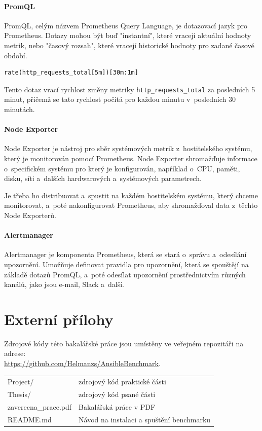 \subsubsection{PromQL}
PromQL, celým názvem Prometheus Query Language, je dotazovací jazyk pro Prometheus.
Dotazy mohou být buď "instantní", které vracejí aktuální hodnoty metrik, nebo "časový rozsah", které vracejí historické hodnoty pro zadané časové období. \cite{prometheusdocs}
\begin{lstlisting}[language=promql, caption={PromQL - ukázka dotazů}, label={lst:promql}, captionpos=b]
    rate(http_requests_total[5m])[30m:1m]
\end{lstlisting}
Tento dotaz vrací rychlost změny metriky \texttt{http\_requests\_total} za posledních 5 minut, přičemž se tato rychlost počítá pro každou minutu v~posledních 30 minutách.
\clearpage
\subsubsection{Node Exporter}
Node Exporter je nástroj pro sběr systémových metrik z~hostitelského systému, který je monitorován pomocí Prometheus.
Node Exporter shromažďuje informace o~specifickém systému pro který je konfigurován, například o~CPU, paměti, disku, síti a~dalších hardwarových a~systémových parametrech. \cite{prometheusdocs}

Je třeba ho distribuovat a~spustit na každém hostitelském systému, který chceme monitorovat, a~poté nakonfigurovat Prometheus, aby shromažďoval data z~těchto Node Exporterů. \cite{prometheusdocs}
\subsubsection{Alertmanager}
Alertmanager je komponenta Prometheus, která se stará o~správu a~odesílání upozornění.
Umožňuje definovat pravidla pro upozornění, která se spouštějí na základě dotazů PromQL, a~poté odesílat upozornění prostřednictvím různých kanálů, jako jsou e-mail, Slack a~další. \cite{prometheusdocs}

\chapter{Externí přílohy\label{sec:ep}}

Zdrojové kódy této bakalářské práce jsou umístěny ve veřejném repozitáři na adrese:\\ \url{https://github.com/Helmanzs/AnsibleBenchmark}.

\begin{longtable}{ll}
\hline
Project/ & zdrojový kód praktické části \\
Thesis/ & zdrojový kód psané části \\
zaverecna\_prace.pdf & Bakalářská práce v PDF \\
README.md & Návod na instalaci a spuštění benchmarku \\
\hline
\end{longtable}